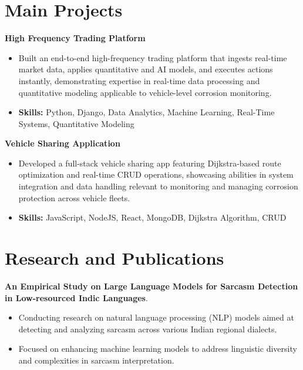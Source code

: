 \documentclass[a4paper,11pt]{article}
\begin{document}
\section{\textbf{Main Projects}}

\vspace{1mm}
  \textbf{High Frequency Trading Platform  }
\vspace{-1.5mm} %
\begin{itemize}
  \item Built an end-to-end high-frequency trading platform that ingests real-time market data, applies quantitative and AI models, and executes actions instantly, demonstrating expertise in real-time data processing and quantitative modeling applicable to vehicle-level corrosion monitoring.
\vspace{-3mm}
  \item \textbf{Skills:} Python, Django, Data Analytics, Machine Learning, Real-Time Systems, Quantitative Modeling
\end{itemize}


\vspace{1mm}
   \textbf{Vehicle Sharing Application }
\vspace{-1.5mm} %
\begin{itemize}
  \item Developed a full-stack vehicle sharing app featuring Dijkstra-based route optimization and real-time CRUD operations, showcasing abilities in system integration and data handling relevant to monitoring and managing corrosion protection across vehicle fleets.
\vspace{-3mm}
  \item \textbf{Skills:} JavaScript, NodeJS, React, MongoDB, Dijkstra Algorithm, CRUD
\end{itemize}



\section{\textbf{Research and Publications} \hfill }
\vspace{1mm}
  \textbf{An Empirical Study on Large Language Models for Sarcasm Detection in Low-resourced Indic Languages}.
\vspace{-1mm} %
\begin{itemize}
  \item Conducting research on natural language processing (NLP) models aimed at detecting and analyzing sarcasm across various Indian regional dialects.
\vspace{-3mm}
  \item Focused on enhancing machine learning models to address linguistic diversity and complexities in sarcasm interpretation.
\end{itemize}
\end{document}
